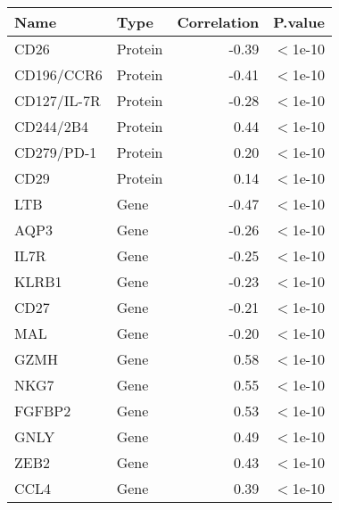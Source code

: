 \begin{tabular}{llrl}
  \hline
Name & Type & Correlation & P.value \\ 
  \hline
CD26 & Protein & -0.39 & $<$1e-10 \\ 
  CD196/CCR6 & Protein & -0.41 & $<$1e-10 \\ 
  CD127/IL-7R & Protein & -0.28 & $<$1e-10 \\ 
  CD244/2B4 & Protein & 0.44 & $<$1e-10 \\ 
  CD279/PD-1 & Protein & 0.20 & $<$1e-10 \\ 
  CD29 & Protein & 0.14 & $<$1e-10 \\ 
  LTB & Gene & -0.47 & $<$1e-10 \\ 
  AQP3 & Gene & -0.26 & $<$1e-10 \\ 
  IL7R & Gene & -0.25 & $<$1e-10 \\ 
  KLRB1 & Gene & -0.23 & $<$1e-10 \\ 
  CD27 & Gene & -0.21 & $<$1e-10 \\ 
  MAL & Gene & -0.20 & $<$1e-10 \\ 
  GZMH & Gene & 0.58 & $<$1e-10 \\ 
  NKG7 & Gene & 0.55 & $<$1e-10 \\ 
  FGFBP2 & Gene & 0.53 & $<$1e-10 \\ 
  GNLY & Gene & 0.49 & $<$1e-10 \\ 
  ZEB2 & Gene & 0.43 & $<$1e-10 \\ 
  CCL4 & Gene & 0.39 & $<$1e-10 \\ 
   \hline
\end{tabular}

